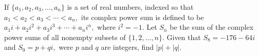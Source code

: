 If $\{a_1,a_2,a_3,\ldots,a_n\}$ is a set of real numbers, indexed so that $a_1<a_2<a_3<\cdots<a_n,$ its complex power sum is defined to be $a_1i+a_2i^2+a_3i^3+\cdots+a_ni^n,$ where $i^2=-1.$  Let $S_n$ be the sum of the complex power sums of all nonempty subsets of $\{1,2,\ldots,n\}.$  Given that $S_8=-176-64i$ and $S_9=p+qi,$ were $p$ and $q$ are integers, find $|p|+|q|.$